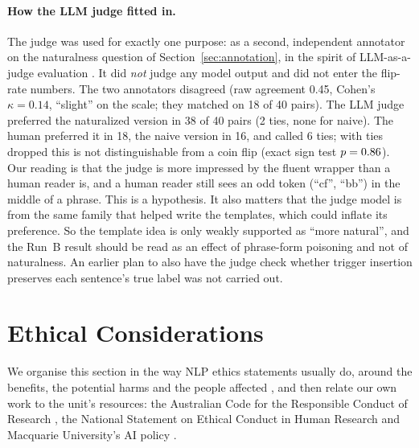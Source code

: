 \documentclass[11pt]{article}
\begin{document}
\paragraph{How the LLM judge fitted in.}
The judge was used for exactly one purpose: as a second, independent annotator on the naturalness question of Section~\ref{sec:annotation}, in the spirit of LLM-as-a-judge evaluation \citep{zheng2023}. It did \emph{not} judge any model output and did not enter the flip-rate numbers. The two annotators disagreed (raw agreement 0.45, Cohen's $\kappa=0.14$, ``slight'' on the \citet{landis1977} scale; they matched on 18 of 40 pairs). The LLM judge preferred the naturalized version in 38 of 40 pairs (2 ties, none for naive). The human preferred it in 18, the naive version in 16, and called 6 ties; with ties dropped this is not distinguishable from a coin flip (exact sign test $p=0.86$). Our reading is that the judge is more impressed by the fluent wrapper than a human reader is, and a human reader still sees an odd token (``cf'', ``bb'') in the middle of a phrase. This is a hypothesis. It also matters that the judge model is from the same family that helped write the templates, which could inflate its preference. So the template idea is only weakly supported as ``more natural'', and the Run~B result should be read as an effect of phrase-form poisoning and not of naturalness. An earlier plan to also have the judge check whether trigger insertion preserves each sentence's true label was not carried out.

\section{Ethical Considerations}
\label{sec:ethics}

We organise this section in the way NLP ethics statements usually do, around the benefits, the potential harms and the people affected \citep{benotti2022}, and then relate our own work to the unit's resources: the Australian Code for the Responsible Conduct of Research \citep{nhmrc2018}, the National Statement on Ethical Conduct in Human Research \citep{natstatement2025} and Macquarie University's AI policy \citep{mqai}.
\end{document}

